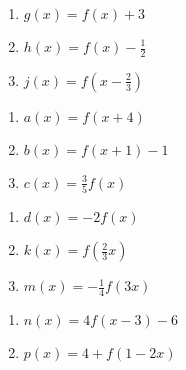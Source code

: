 \begin{multicols}{3}
\begin{enumerate}
\setcounter{enumi}{\value{HW}}

\item $g(x) = f(x) + 3$ \label{transthirdgraphfirst}
\item $h(x) = f(x) - \frac{1}{2}$
\item $j(x) = f\left(x - \frac{2}{3}\right)$

\setcounter{HW}{\value{enumi}}
\end{enumerate}
\end{multicols}

\begin{multicols}{3}
\begin{enumerate}
\setcounter{enumi}{\value{HW}}

\item $a(x) = f(x + 4)$
\item $b(x) = f(x + 1) - 1$ 
\item $c(x) = \frac{3}{5}f(x)$


\setcounter{HW}{\value{enumi}}
\end{enumerate}
\end{multicols}

\begin{multicols}{3}
\begin{enumerate}
\setcounter{enumi}{\value{HW}}


\item $d(x) = -2f(x)$
\item $k(x) = f\left(\frac{2}{3}x\right)$
\item $m(x) = -\frac{1}{4}f(3x)$

\setcounter{HW}{\value{enumi}}
\end{enumerate}
\end{multicols}

\begin{multicols}{2}
\begin{enumerate}
\setcounter{enumi}{\value{HW}}

\item $n(x) = 4f(x - 3) - 6$
\item $p(x) = 4 + f(1 - 2x)$ \label{transthirdgraphlast}

\setcounter{HW}{\value{enumi}}
\end{enumerate}
\end{multicols}

